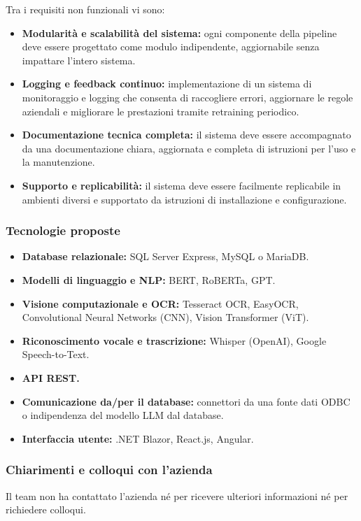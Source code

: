 \documentclass[a4paper,11pt]{article}
\begin{document}
Tra i requisiti non funzionali vi sono:
\begin{itemize}
 \item \textbf{Modularità e scalabilità del sistema:} ogni componente della pipeline deve essere progettato come modulo indipendente, aggiornabile senza impattare l'intero sistema.
 \item \textbf{Logging e feedback continuo:} implementazione di un sistema di monitoraggio e logging che consenta di raccogliere errori, aggiornare le regole aziendali e migliorare le prestazioni tramite retraining periodico.
 \item \textbf{Documentazione tecnica completa:} il sistema deve essere accompagnato da una documentazione chiara, aggiornata e completa di istruzioni per l'uso e la manutenzione.
 \item \textbf{Supporto e replicabilità:} il sistema deve essere facilmente replicabile in ambienti diversi e supportato da istruzioni di installazione e configurazione.
\end{itemize}
\subsubsection{Tecnologie proposte}
\begin{itemize}[noitemsep, topsep=0pt]
 \item \textbf{Database relazionale:} SQL Server Express, MySQL o MariaDB.
 \item \textbf{Modelli di linguaggio e NLP:} BERT, RoBERTa, GPT.
 \item \textbf{Visione computazionale e OCR:} Tesseract OCR, EasyOCR, Convolutional Neural Networks (CNN), Vision Transformer (ViT).
 \item \textbf{Riconoscimento vocale e trascrizione:} Whisper (OpenAI), Google Speech-to-Text.
 \item \textbf{API REST.}
 \item \textbf{Comunicazione da/per il database:} connettori da una fonte dati ODBC o indipendenza del modello LLM dal database.
 \item \textbf{Interfaccia utente:} .NET Blazor, React.js, Angular.
\end{itemize}

\subsubsection{Chiarimenti e colloqui con l'azienda}
Il team non ha contattato l'azienda né per ricevere ulteriori informazioni né per richiedere colloqui.
\end{document}
